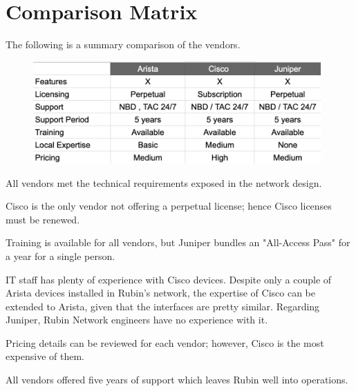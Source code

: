 \section{Comparison Matrix}

The following is a summary comparison of the vendors.

\begin{figure}
    \includegraphics[width=11cm]{images/matrix.jpg}
    \centering
\end{figure}

All vendors met the technical requirements exposed in the network design. 

Cisco is the only vendor not offering a perpetual license; hence Cisco licenses must be renewed. 

Training is available for all vendors, but Juniper bundles an "All-Access Pass" for a year for a single person.

IT staff has plenty of experience with Cisco devices. Despite only a couple of Arista devices installed in Rubin's network, the expertise of Cisco can be extended to Arista, given that the interfaces are pretty similar. Regarding Juniper, Rubin Network engineers have no experience with it. 

Pricing details can be reviewed for each vendor; however, Cisco is the most expensive of them. 

All vendors offered five years of support which leaves Rubin well into operations. 

